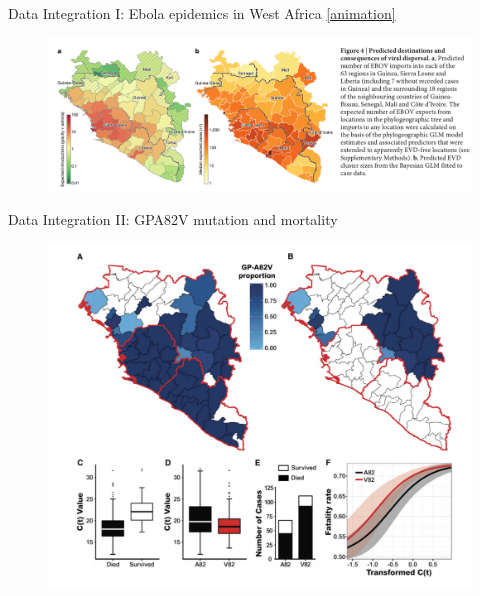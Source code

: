 \documentclass[newPxFont,numfooter,sectionpages]{beamer}
\begin{document}

\begin{frame}{Data Integration I: Ebola epidemics in West Africa}
\href{http://virological.org/t/phylogeography-of-2014-2015-ebola-virus-epidemic/199}{[animation]}
\begin{figure}
	\includegraphics[scale=.30]{figures/ebov_glm_predictions.pdf} 
\end{figure}
\end{frame}

\begin{frame}{Data Integration II: GPA82V mutation and mortality}
\begin{figure}
	\includegraphics[scale=.30]{figures/gpa82v_results.pdf} 
\end{figure}
\end{frame}
\end{document}
